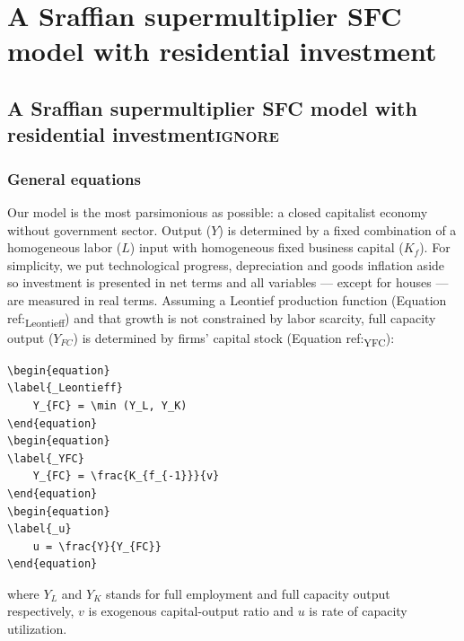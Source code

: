 \documentclass[12pt]{article}
\begin{document}
\section{A Sraffian supermultiplier SFC model with residential investment}
\label{sec:orga7ada79}
\label{sec:Model}
\subsection{A Sraffian supermultiplier SFC model with residential investment\hfill{}\textsc{ignore}}
\label{sec:org35b6872}

\subsubsection{General equations}
\label{sec:org97a6f6f}

Our model is the most parsimonious as possible: a closed capitalist economy without government sector. Output (\(Y\)) is determined by  a fixed combination of a homogeneous labor (\(L\)) input with homogeneous fixed business capital (\(K_f\)). 
For simplicity, we put technological progress, depreciation and goods inflation aside so investment is presented in net terms and all variables --- except for houses --- are measured in real terms.
Assuming a Leontief production function (Equation ref:\textsubscript{Leontieff}) and that growth is not constrained by labor scarcity, full capacity output (\(Y_{FC}\)) is
determined by firms' capital stock (Equation ref:\textsubscript{YFC}):
\begin{verbatim}
\begin{equation}
\label{_Leontieff}
    Y_{FC} = \min (Y_L, Y_K)
\end{equation}
\begin{equation}
\label{_YFC}
    Y_{FC} = \frac{K_{f_{-1}}}{v}
\end{equation}
\begin{equation}
\label{_u}
    u = \frac{Y}{Y_{FC}}
\end{equation}
\end{verbatim}
where \(Y_L\) and \(Y_K\) stands for full employment and full capacity output respectively, \(v\) is exogenous capital-output ratio and \(u\) is rate of capacity utilization.
\end{document}
